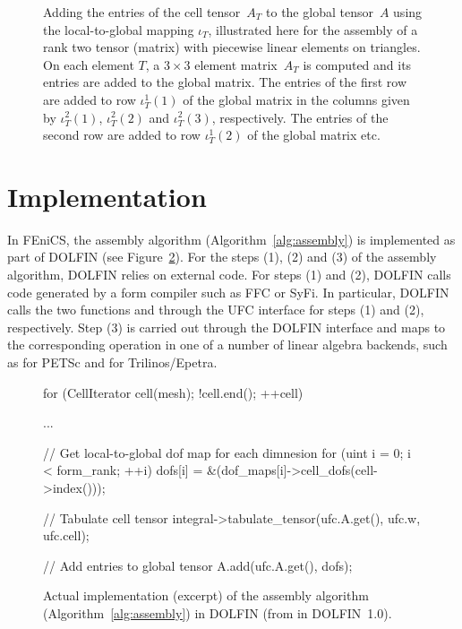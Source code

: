 \begin{figure}
  \begin{center}
    \caption{Adding the entries of the cell tensor~$A_T$ to the global
      tensor~$A$ using the local-to-global mapping $\iota_T$,
      illustrated here for the assembly of a rank two tensor (matrix)
      with piecewise linear elements on triangles. On each element
      $T$, a $3 \times 3$ element matrix~$A_T$ is computed and its
      entries are added to the global matrix. The entries of the first
      row are added to row $\iota^1_T(1)$ of the global matrix in the
      columns given by $\iota^2_T(1)$, $\iota^2_T(2)$ and
      $\iota^2_T(3)$, respectively. The entries of the second row are
      added to row $\iota^1_T(2)$ of the global matrix etc.}
    \label{fig:insertion}
  \end{center}
\end{figure}

\section{Implementation}

In FEniCS, the assembly algorithm (Algorithm~\ref{alg:assembly}) is
implemented as part of DOLFIN (see
Figure~\ref{fig:assembly,code}). For the steps (1), (2) and (3) of the
assembly algorithm, DOLFIN relies on external code. For steps (1) and
(2), DOLFIN calls code generated by a form compiler such as FFC or
SyFi. In particular, DOLFIN calls the two functions
 and  through the UFC
interface for steps (1) and (2), respectively. Step (3) is carried out
through the DOLFIN  interface and maps to the
corresponding operation in one of a number of linear algebra backends,
such as  for PETSc and 
for Trilinos/Epetra.
%
\begin{figure}
  \begin{c++}
for (CellIterator cell(mesh); !cell.end(); ++cell)
{
  ...

  // Get local-to-global dof map for each dimnesion
  for (uint i = 0; i < form_rank; ++i)
    dofs[i] = &(dof_maps[i]->cell_dofs(cell->index()));

  // Tabulate cell tensor
  integral->tabulate_tensor(ufc.A.get(),
                            ufc.w,
                            ufc.cell);

  // Add entries to global tensor
  A.add(ufc.A.get(), dofs);
}
\end{c++}
  \label{fig:assembly,code}
  \caption{Actual implementation (excerpt) of the assembly algorithm
    (Algorithm~\ref{alg:assembly}) in DOLFIN (from 
    in DOLFIN~1.0).}
\end{figure}

